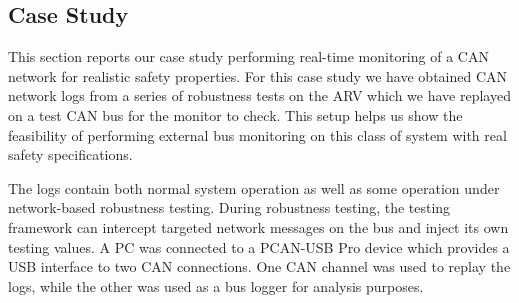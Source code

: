 %

\subsection{Case Study}
\label{sec:case_study}
This section reports our case study performing real-time monitoring of a CAN network for realistic safety properties.
For this case study we have obtained CAN network logs from a series of robustness tests on the ARV which we have replayed on a test CAN bus for the monitor to check.
This setup %
helps us show the feasibility of performing external bus monitoring on this class of system with real safety specifications.


The logs contain both normal system operation as well as some operation under network-based robustness testing. During robustness testing, the testing framework can intercept targeted network messages on the bus and inject its own testing values. %
A PC was connected to a PCAN-USB Pro \cite{PCAN-USBPro} device which provides a USB interface to two CAN connections. One CAN channel was used to replay the logs, while the other was used as a bus logger for analysis purposes.

